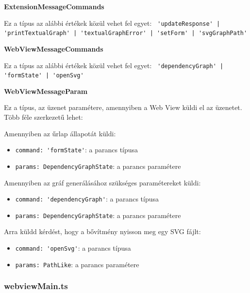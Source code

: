 \vspace{14pt}
\noindent \textbf{ExtensionMessageCommands}

\noindent Ez a típus az alábbi értékek közül vehet fel egyet: \lstinline{ 'updateResponse' | 'printTextualGraph' | 'textualGraphError' | 'setForm' | 'svgGraphPath'}




\vspace{14pt}
\noindent \textbf{WebViewMessageCommands}

\noindent Ez a típus az alábbi értékek közül vehet fel egyet: \lstinline{ 'dependencyGraph' | 'formState' | 'openSvg'}





\vspace{14pt}
\noindent \textbf{WebViewMessageParam}

\noindent Ez a típus, az üzenet paramétere, amennyiben a Web View küldi el az üzenetet. Több féle szerkezetű lehet:

\noindent Amennyiben az űrlap állapotát küldi:
\begin{itemize}
    \item \lstinline{command: 'formState'}: a parancs típusa
    \item \lstinline{params: DependencyGraphState}: a parancs paramétere
\end{itemize}

\noindent Amennyiben az gráf generálásához szükséges paramétereket küldi:
\begin{itemize}
    \item \lstinline{command: 'dependencyGraph'}: a parancs típusa
    \item \lstinline{params: DependencyGraphState}: a parancs paramétere
\end{itemize}


\noindent Arra küldd kérdést, hogy a bővítmény nyisson meg egy SVG fájlt:
\begin{itemize}
    \item \lstinline{command: 'openSvg'}: a parancs típusa
    \item \lstinline{params: PathLike}: a parancs paramétere
\end{itemize}



\subsubsection{webviewMain.ts}

